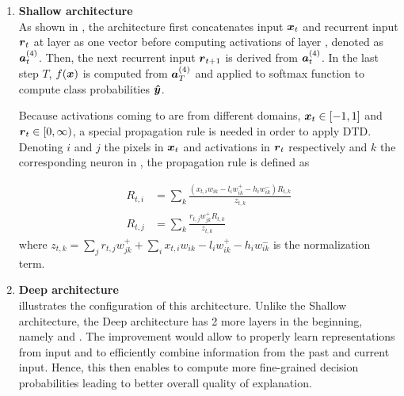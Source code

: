\begin{enumerate}
	\item \textbf{Shallow architecture} \\
		As shown in \addfigure{\ref{fig:shallow_arch}}, the  architecture first concatenates  input $\patvector{x}_t$  and recurrent input $\patvector{r}_t$ at layer  as one vector before computing activations of layer , denoted as $\patvector{a}_t^{(4)}$. Then,  the next recurrent input $\patvector{r}_{t+1}$ 	 is derived from $\patvector{a}_t^{(4)}$. In the last step $T$, $f(\boldsymbol{x})$ is computed from $\patvector{a}^{(4)}_{T}$ and applied to softmax function to compute class probabilities $\patvector{\hat{y}}$. 
		
Because activations coming to  are from different domains, $\boldsymbol{x}_t \in [-1, 1]$ and $\patvector{r}_t \in [0, \infty) $, a special propagation rule is needed in order to apply DTD.  Denoting $i$ and $j$ the pixels in $\boldsymbol{x}_t$ and activations in $\patvector{r}_t$ respectively and $k$ the corresponding neuron in , the propagation rule is defined as 
		
\begin{align}
	R_{t, i} &= \sum_k \frac{(x_{t, i} w_{ik} - l_i w_{ik}^+ - h_i w_{ik}^-) R_{t,k}}{z_{t,k}} \\	
     R_{t, j} &= \sum_k \frac{r_{t, j} w_{jk}^+ R_{t,k}}{z_{t,k}}
\end{align}
where $z_{t,k} = \sum_j r_{t,j} w_{jk}^+ + \sum_i x_{t,i} w_{ik} - l_i w_{ik}^+ - h_i w_{ik}^-$ is the normalization term.

	\item \textbf{Deep architecture} \\
		\addfigure{\ref{fig:deep_arch}} illustrates the configuration of this architecture. Unlike the Shallow architecture, the Deep architecture has 2 more layers in the beginning, namely  and .  The improvement would allow  to properly learn representations from input and  to efficiently combine information from the past and current input. Hence, this then enables  to compute more fine-grained decision probabilities leading to better overall quality of explanation.
\end{enumerate}

